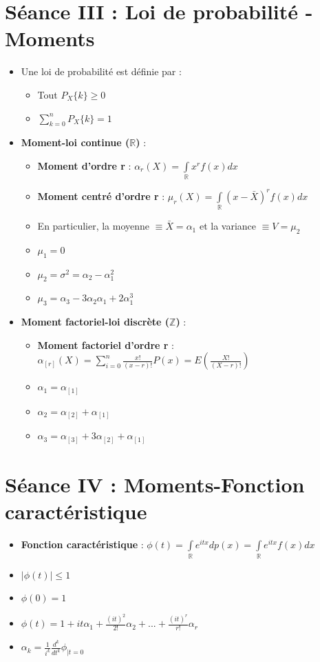 \documentclass[a4paper,11pt]{report}
\begin{document}
\section{Séance III : Loi de probabilité - Moments}
\begin{itemize}
	\item Une loi de probabilité est définie par :
	\begin{itemize}
		\item Tout $P_X\{k\} \ge 0$
		\item $\sum\limits_{k=0}^{n}{P_X\{k\}} = 1$
	\end{itemize}
	\newpage
	\item \textbf{Moment-loi continue ($\mathbb{R}$)} :
	\begin{itemize}
		\item \textbf{Moment d'ordre r} : $\alpha_r(X) = \int\limits_{\mathbb{R}}{x^rf(x)dx}$
		\item \textbf{Moment centré d'ordre r} : $\mu_r(X) = \int\limits_{\mathbb{R}}{(x-\bar{X})^rf(x)dx}$
		\item En particulier, la moyenne $\equiv \bar{X} = \alpha_1$ et la variance $\equiv V=\mu_2$
		\item \textbf{$\mu_1 = 0$}
		\item \textbf{$\mu_2 = \sigma^2 = \alpha_2 - \alpha_1^2$}
		\item \textbf{$\mu_3 = \alpha_3 - 3\alpha_2 \alpha_1 + 2\alpha_1^3$}\\
	\end{itemize}
	\item \textbf{Moment factoriel-loi discrète ($\mathbb{Z}$)} :
	\begin{itemize}
		\item \textbf{Moment factoriel d'ordre r} : $\alpha_{[r]}(X) = \sum\limits_{i = 0}^{n}{\frac{x!}{(x-r)!}P(x)} = E(\frac{X!}{(X-r)!})$
		\item \textbf{$\alpha_1 = \alpha_{[1]}$}
		\item \textbf{$\alpha_2 = \alpha_{[2]} + \alpha_{[1]}$}
		\item \textbf{$\alpha_3 = \alpha_{[3]} + 3\alpha_{[2]} + \alpha_{[1]}$}
	\end{itemize}
\end{itemize}

\section{Séance IV : Moments-Fonction caractéristique}
\begin{itemize}
	\item \textbf{Fonction caractéristique} : $\phi(t) = \int\limits_{\mathbb{R}}{e^{itx}dp(x)} = \int\limits_{\mathbb{R}}{e^{itx}f(x)dx}$
	\item \textbf{$|\phi(t)| \le 1$}
	\item \textbf{$\phi(0) = 1$}
	\item \textbf{$\phi(t) = 1 + it\alpha_1 + \frac{(it)^2}{2!}\alpha_2 + ... + \frac{(it)^r}{r!}\alpha_r$}
	\item \textbf{$\alpha_k = \frac{1}{i^k}\frac{d^k}{dt^k} \phi_{|t=0}$}
\end{itemize}
\end{document}
